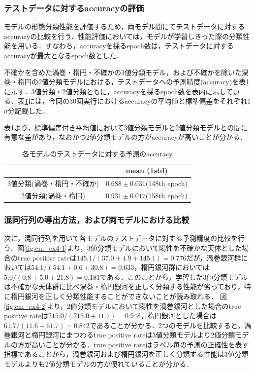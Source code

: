 \documentclass[a4j, 11pt]{jreport}
\begin{document}

\subsubsection{テストデータに対するaccuracyの評価}
モデルの形態分類性能を評価するため，両モデル間にてテストデータに対するaccuracyの比較を行う．性能評価においては，モデルが学習しきった際の分類性能を用いる．すなわち，accuracyを採るepoch数は，テストデータに対するaccuracyが最大となるepoch数とした．

不確かを含めた渦巻・楕円・不確かの3値分類モデル，および不確かを除いた渦巻・楕円の2値分類モデルにおける，テストデータへの予測精度(accuracy)を表\ref{tb:accs_4.2}に示す．3値分類・2値分類ともに，accuracyを採るepoch数を表内に示している．表\ref{tb:accs_4.2}には，今回の30回実行におけるaccuracyの平均値と標準偏差をそれぞれ1$\sigma$分記載した．

表\ref{tb:accs_4.2}より，標準偏差付き平均値において3値分類モデルと2値分類モデルとの間に有意な差があり，なおかつ2値分類モデルの方がaccuracyが高いことが分かる．

\begin{table}[htbp]
  \centering
	\caption{各モデルのテストデータに対する予測のaccuracy}
  \begin{tabular}{|c|c|}
		\hline
    & mean (1std) \\ \hline
    3値分類(渦巻・楕円・不確か) & $0.688 \pm 0.031$(148th epoch) \\ \hline
    2値分類(渦巻・楕円) & $0.931 \pm 0.017$(158th epoch) \\ \hline
  \end{tabular}
  \label{tb:accs_4.2}
\end{table}

\subsubsection{混同行列の導出方法，および両モデルにおける比較}
次に，混同行列を用いて各モデルのテストデータに対する予測精度の比較を行う．図\ref{fig:cm_ex4-1}より，3値分類モデルにおいて陽性を不確かな天体とした場合のtrue positive rateは$145.1/(37.0+4.9+145.1) = 0.776$だが，渦巻銀河群においては$54.1/(54.1+0.6+30.8) = 0.633$，楕円銀河群においては$5.0/(0.8+5.0+21.8) = 0.181$である．このことから，学習した3値分類モデルは不確かな天体群に比べ渦巻・楕円銀河を正しく分類する性能が劣っており，特に楕円銀河を正しく分類性能することができないことが読み取れる．
図\ref{fig:cm_ex4-2}より，2値分類モデルにおいて陽性を渦巻銀河とした場合のtrue positive rateは$215.0/(215.0+11.7) = 0.948$，楕円銀河とした場合は$61.7/(11.6+61.7) = 0.842$であることが分かる．2つのモデルを比較すると，渦巻銀河と楕円銀河にまつわるtrue positive rateは3値分類モデルより2値分類モデルの方が高いことが分かる．true positive rateはラベル毎の予測の正確性を表す指標であることから，渦巻銀河および楕円銀河を正しく分類する性能は3値分類モデルよりも2値分類モデルの方が優れていることが分かる．
\end{document}
